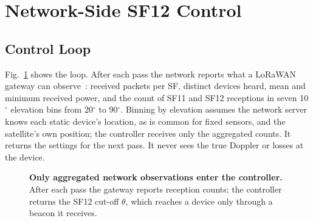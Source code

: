 \documentclass[journal]{IEEEtran}
\begin{document}
\section{Network-Side SF12 Control}\label{sec:controller}

\subsection{Control Loop}
Fig.~\ref{fig:loop} shows the loop. After each pass the network reports what a LoRaWAN gateway can observe~\cite{sx1301}: received packets per SF, distinct devices heard, mean and minimum received power, and the count of SF11 and SF12 receptions in seven 10$^\circ$ elevation bins from 20$^\circ$ to 90$^\circ$. Binning by elevation assumes the network server knows each static device's location, as is common for fixed sensors, and the satellite's own position; the controller receives only the aggregated counts. It returns the settings for the next pass. It never sees the true Doppler or losses at the device.

\begin{figure}[t]
\centering
{}
\caption{\textbf{Only aggregated network observations enter the controller.} After each pass the gateway reports reception counts; the controller returns the SF12 cut-off $\theta$, which reaches a device only through a beacon it receives.}
\label{fig:loop}
\end{figure}
\end{document}
